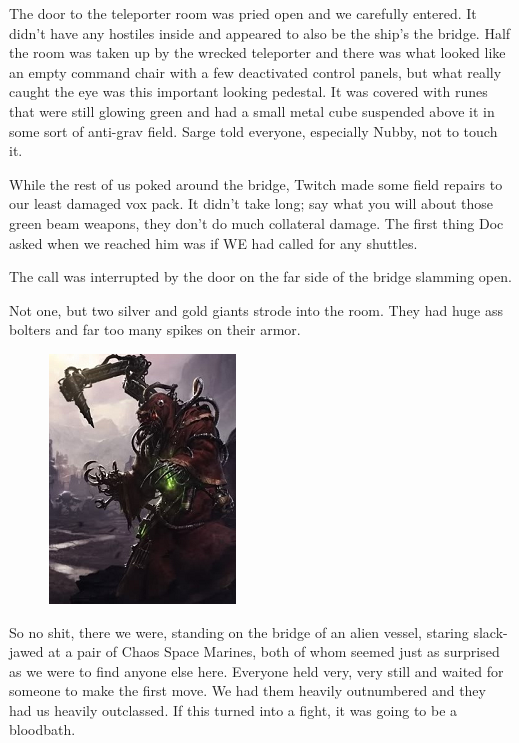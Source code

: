 The door to the teleporter room was pried open and we carefully entered. 
It didn’t have any hostiles inside and appeared to also be the ship’s the bridge. 
Half the room was taken up by the wrecked teleporter and there was what looked like an empty command chair with a few deactivated control panels, but what really caught the eye was this important looking pedestal. 
It was covered with runes that were still glowing green and had a small metal cube suspended above it in some sort of anti-grav field. 
Sarge told everyone, especially Nubby, not to touch it. 


While the rest of us poked around the bridge, Twitch made some field repairs to our least damaged vox pack. 
It didn’t take long; 
say what you will about those green beam weapons, they don’t do much collateral damage. 
The first thing Doc asked when we reached him was if WE had called for any shuttles.

The call was interrupted by the door on the far side of the bridge slamming open.

Not one, but two silver and gold giants strode into the room. 
They had huge ass bolters and far too many spikes on their armor.

\begin{figure}
	\begin{center}
		\includegraphics[width=\figwidth]{pics/8/51.png}
	\end{center}
\end{figure}
So no shit, there we were, standing on the bridge of an alien vessel, staring slack-jawed at a pair of Chaos Space Marines, both of whom seemed just as surprised as we were to find anyone else here. 
Everyone held very, very still and waited for someone to make the first move. 
We had them heavily outnumbered and they had us heavily outclassed. 
If this turned into a fight, it was going to be a bloodbath.
 
